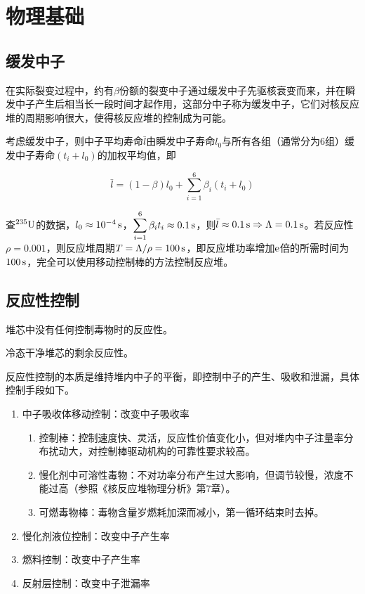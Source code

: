 \section{物理基础}

\subsection{缓发中子}

在实际裂变过程中，约有$\beta$份额的裂变中子通过缓发中子先驱核衰变而来，并在瞬发中子产生后相当长一段时间才起作用，这部分中子称为缓发中子，它们对核反应堆的周期影响很大，使得核反应堆的控制成为可能。

考虑缓发中子，则中子平均寿命$\bar{l}$由瞬发中子寿命$l_0$与所有各组（通常分为6组）缓发中子寿命$(t_i + l_0)$的加权平均值，即

\begin{equation}
    \bar{l} = (1 - \beta) l_0 + \sum_{i=1}^{6} \beta_i (t_i + l_0)
\end{equation}

查${}^{235} {\rm U}$的数据，$l_0 \approx 10^{-4}\,{\rm s}$，$\displaystyle \sum_{i=1}^{6} \beta_i t_i \approx 0.1\,{\rm s}$，则$\bar{l} \approx 0.1\,{\rm s} \Rightarrow \Lambda = 0.1\,{\rm s}$。若反应性$\rho = 0.001$，则反应堆周期$T = \Lambda / \rho = 100\,{\rm s}$，即反应堆功率增加${\rm e}$倍的所需时间为$100\,{\rm s}$，完全可以使用移动控制棒的方法控制反应堆。

\subsection{反应性控制}

\begin{definition}[剩余反应性]
    堆芯中没有任何控制毒物时的反应性。
\end{definition}

\begin{definition}[后备反应性]
    冷态干净堆芯的剩余反应性。
\end{definition}

反应性控制的本质是维持堆内中子的平衡，即控制中子的产生、吸收和泄漏，具体控制手段如下。
\begin{enumerate}
    \item 中子吸收体移动控制：改变中子吸收率
    \begin{enumerate}
        \item 控制棒：控制速度快、灵活，反应性价值变化小，但对堆内中子注量率分布扰动大，对控制棒驱动机构的可靠性要求较高。
        \item 慢化剂中可溶性毒物：不对功率分布产生过大影响，但调节较慢，浓度不能过高（参照《核反应堆物理分析》第7章）。
        \item 可燃毒物棒：毒物含量岁燃耗加深而减小，第一循环结束时去掉。
    \end{enumerate}
    \item 慢化剂液位控制：改变中子产生率
    \item 燃料控制：改变中子产生率
    \item 反射层控制：改变中子泄漏率
\end{enumerate}

